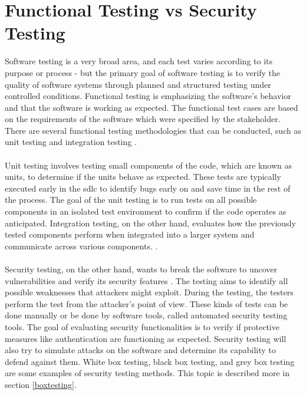 \section{Functional Testing vs Security Testing}
\label{Functional Testing vs Security Testing}
Software testing is a very broad area, and each test varies according to its purpose or process - but the primary goal of software testing is to verify the quality of software systems through planned and structured testing under controlled conditions. Functional testing is emphasizing the software's behavior and that the software is working as expected. The functional test cases are based on the requirements of the software which were specified by the stakeholder. There are several functional testing methodologies that can be conducted, such as unit testing and integration testing \cite{difftesting}. 
\\~\\
Unit testing involves testing small components of the code, which are known as units, to determine if the units behave as expected. These tests are typically executed early in the \acrshort{sdlc} to identify bugs early on and save time in the rest of the process. The goal of the unit testing is to run tests on all possible components in an isolated test environment to confirm if the code operates as anticipated. Integration testing, on the other hand, evaluates how the previously tested components perform when integrated into a larger system and communicate across various components. \cite{unitvsintergration}.
\\~\\
Security testing, on the other hand, wants to break the software to uncover vulnerabilities and verify its security features \cite{whysectest}. The testing aims to identify all possible weaknesses that attackers might exploit. During the testing, the testers perform the test from the attacker's point of view. These kinds of tests can be done manually or be done by software tools, called automated security testing tools. The goal of evaluating security functionalities is to verify if protective measures like authentication are functioning as expected. Security testing will also try to simulate attacks on the software and determine its capability to defend against them. White box testing, black box testing, and grey box testing are some examples of security testing methods. This topic is described more in section \ref{boxtesting}. 






